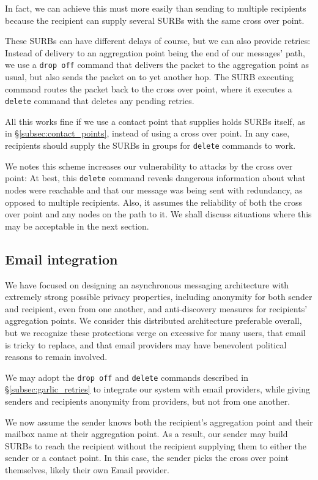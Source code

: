In fact, we can achieve this must more easily than sending to
multiple recipients because the recipient can supply several SURBs
with the same cross over point.

These SURBs can have different delays of course, but we can also
provide retries:  Instead of delivery to an aggregation point being
the end of our messages' path, we use a {\tt drop off} command that
delivers the packet to the aggregation point as usual, but also
sends the packet on to yet another hop.  The SURB executing command
routes the packet back to the cross over point, where it executes a
{\tt delete} command that deletes any pending retries.

All this works fine if we use a contact point that supplies holds
SURBs itself, as in \S\ref{subsec:contact_points}, instead of using
a cross over point.  In any case, recipients should supply the SURBs
in groups for {\tt delete} commands to work.

We notes this scheme increases our vulnerability to attacks by the
cross over point:  At best, this {\tt delete} command reveals
dangerous information about what nodes were reachable and that our
message was being sent with redundancy, as opposed to multiple 
recipients.  Also, it assumes the reliability of both the cross over
point and any nodes on the path to it.
%
We shall discuss situations where this may be acceptable in the next section.


\subsection{Email integration}

We have focused on designing an asynchronous messaging architecture
with extremely strong possible privacy properties, including
anonymity for both sender and recipient, even from one another, and
anti-discovery measures for recipients' aggregation points.  
%
We consider this distributed architecture preferable overall, but
we recognize these protections verge on excessive for many users,
that email is tricky to replace, and that email providers may have
benevolent political reasons to remain involved.

We may adopt the {\tt drop off} and {\tt delete} commands described
in \S\ref{subsec:garlic_retries} to integrate our system with email
providers, while giving senders and recipients anonymity from
providers, but not from one another.

We now assume the sender knows both the recipient's aggregation point
and their mailbox name at their aggregation point.  As a result, our
sender may build SURBs to reach the recipient without the recipient
supplying them to either the sender or a contact point.  
In this case, the sender picks the cross over point themselves, 
likely their own Email provider.

